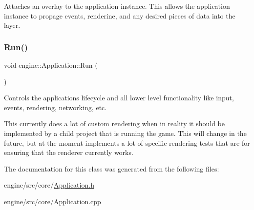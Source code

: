 Attaches an overlay to the application instance. This allows the application instance to propage events, renderine, and any desired pieces of data into the layer. \mbox{\label{classengine_1_1Application_a4dcdf08d920f7f63013a25cb1e80438b}} 
\subsubsection{\texorpdfstring{Run()}{Run()}}
{\footnotesize\ttfamily void engine\+::\+Application\+::\+Run (\begin{DoxyParamCaption}{ }\end{DoxyParamCaption})}



Controls the applications lifecycle and all lower level functionality like input, events, rendering, networking, etc. 

This currently does a lot of custom rendering when in reality it should be implemented by a child project that is running the game. This will change in the future, but at the moment implements a lot of specific rendering tests that are for ensuring that the renderer currently works. 

The documentation for this class was generated from the following files\+:\begin{DoxyCompactItemize}
\item 
engine/src/core/\hyperlink{Application_8h}{Application.\+h}\item 
engine/src/core/Application.\+cpp\end{DoxyCompactItemize}
